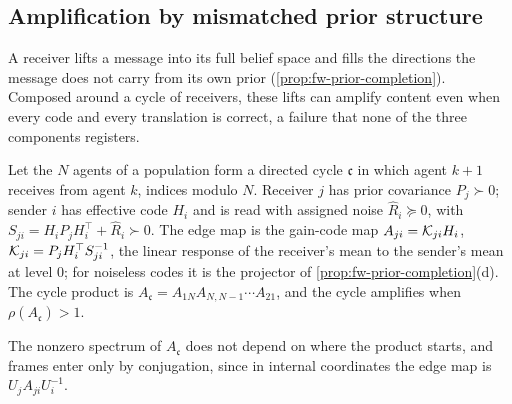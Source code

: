 \subsection{Amplification by mismatched prior structure}\label{sec:coh-amplification}

A receiver lifts a message into its full belief space and fills the directions the message does not carry from its own prior (\cref{prop:fw-prior-completion}). Composed around a cycle of receivers, these lifts can amplify content even when every code and every translation is correct, a failure that none of the three components registers.

\begin{definition}\label{def:coh-cycle-product}
Let the $N$ agents of a population form a directed cycle $\mathfrak c$ in which agent $k+1$ receives from agent $k$, indices modulo $N$. Receiver $j$ has prior covariance $P_j\succ0$; sender $i$ has effective code $H_i$ and is read with assigned noise $\hat R_i\succeq0$, with $S_{ji}=H_iP_jH_i^\top+\hat R_i\succ0$. The edge map is the gain-code map $A_{ji}=\mathcal{K}_{ji}H_i$, $\mathcal{K}_{ji}=P_jH_i^\top S_{ji}^{-1}$, the linear response of the receiver's mean to the sender's mean at level 0; for noiseless codes it is the projector of \cref{prop:fw-prior-completion}(d). The cycle product is $A_{\mathfrak c}=A_{1N}A_{N,N-1}\cdots A_{21}$, and the cycle amplifies when $\rho(A_{\mathfrak c})>1$.
\end{definition}

The nonzero spectrum of $A_{\mathfrak c}$ does not depend on where the product starts, and frames enter only by conjugation, since in internal coordinates the edge map is $U_jA_{ji}U_i^{-1}$.

